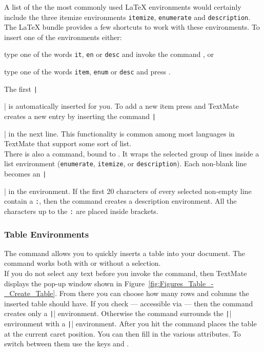 \documentclass[11pt, x11names]{article}
\begin{document}
A list of the the most commonly used LaTeX environments would certainly include the three itemize environments \texttt{itemize}, \texttt{enumerate} and \texttt{description}. The LaTeX bundle provides a few shortcuts to work with these environments. To insert one of the environments either:

\begin{enumerate}

  \begin{sloppypar}
  \item type one of the words \texttt{it}, \texttt{en} or \texttt{desc} and invoke the command , or
  \end{sloppypar}

  \item type one of the words \texttt{item}, \texttt{enum} or \texttt{desc} and press \keys{\tab}.

\end{enumerate}

The first \texttt|\item| is automatically inserted for you. To add a new item press \keys{\enter} and TextMate creates a new entry by inserting the command \texttt|\item| in the next line. This functionality is common among most languages in TextMate that support some sort of list.\\

There is also a  command, bound to . It wraps the selected group of lines inside a list environment (\texttt{enumerate}, \texttt{itemize}, or \texttt{description}). Each non-blank line becomes an \texttt|\item| in the environment. If the first 20 characters of every selected non-empty line contain a \texttt{:}, then the command creates a description environment. All the characters up to the \texttt{:} are placed inside brackets.

\subsubsection{Table Environments}

The command  allows you to quickly inserts a table into your document. The command works both with or without a selection.\\

If you do not select any text before you invoke the command, then TextMate displays the pop-up window shown in Figure~\ref{fig:Figures_Table_-_Create_Table}. From there you can choose how many rows and columns the inserted table should have. If you check  — accessible via  — then the command creates only a \texttt|\tabular| environment. Otherwise the command surrounds the \texttt|\tabular| environment with a \texttt|\table| environment. After you hit  the command places the table at the current caret position. You can then fill in the various attributes. To switch between them use the keys \keys{\tab} and \keys{\shift + \tab}.
\end{document}
